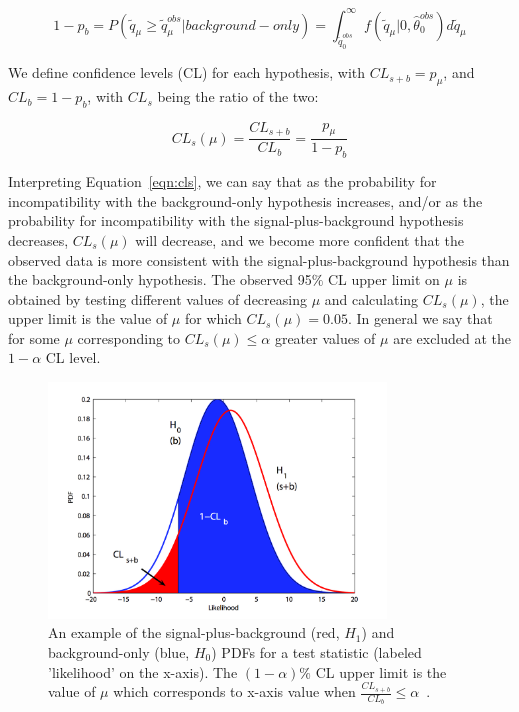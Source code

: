 \begin{equation}
\label{eqn:pvalues2}
1- p_{b} = P(\tilde{q}_{\mu} \geq \tilde{q}_{\mu}^{obs}|background-only) = \int_{\tilde{q}_{0}^{obs}}^{\infty} f(\tilde{q}_{\mu}|0,\hat{\theta}_{0}^{obs}) d\tilde{q}_{\mu}
\end{equation}

\noindent We define confidence levels (CL) for each hypothesis, with $CL_{s+b} = p_{\mu}$, and $CL_{b} = 1-p_{b}$, with $CL_{s}$ being the ratio of the two:

\begin{equation}
\label{eqn:cls}
CL_{s}(\mu) = \frac{CL_{s+b}}{CL_{b}} = \frac{p_{\mu}}{1-p_{b}}
\end{equation}

\noindent Interpreting Equation~\ref{eqn:cls}, we can say that as the probability for incompatibility with the background-only hypothesis increases, and/or as the probability
for incompatibility with the signal-plus-background hypothesis decreases, $CL_{s}(\mu)$ will decrease, and we become more confident that the observed data is more consistent with
the signal-plus-background hypothesis than the background-only hypothesis. The observed 95$\%$ CL upper limit on $\mu$ is obtained by testing different values of decreasing $\mu$ and
calculating $CL_{s}(\mu)$, the upper limit is the value of $\mu$ for which $CL_{s}(\mu) = 0.05$. In general we say that for some $\mu$ corresponding to $CL_{s}(\mu) \leq \alpha$
greater values of $\mu$ are excluded at the $1-\alpha$ CL level. 

\begin{figure}[htb]
        \centering 
        \includegraphics[width=0.80\textwidth]{ch10_figs/cls.pdf}
        \caption[Test statistic PDFs for s+b and b-only hypotheses]{An example of the signal-plus-background (red, $H_{1}$) and background-only (blue, $H_{0}$) PDFs for a
          test statistic (labeled 'likelihood' on the x-axis). The $(1-\alpha)\%$ CL upper limit is the value of $\mu$ which corresponds to x-axis value
          when $\frac{CL_{s+b}}{CL_{b}} \leq \alpha$~\cite{lhc4peds}.}
        \label{fig:cls}
\end{figure}

